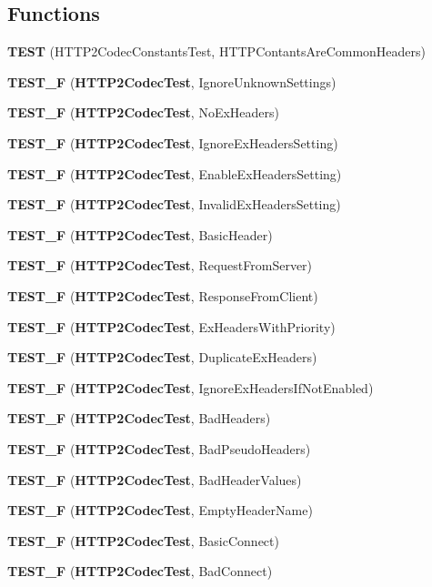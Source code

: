 \subsection*{Functions}
\begin{DoxyCompactItemize}
\item 
{\bf T\+E\+ST} (H\+T\+T\+P2\+Codec\+Constants\+Test, H\+T\+T\+P\+Contants\+Are\+Common\+Headers)
\item 
{\bf T\+E\+S\+T\+\_\+F} ({\bf H\+T\+T\+P2\+Codec\+Test}, Ignore\+Unknown\+Settings)
\item 
{\bf T\+E\+S\+T\+\_\+F} ({\bf H\+T\+T\+P2\+Codec\+Test}, No\+Ex\+Headers)
\item 
{\bf T\+E\+S\+T\+\_\+F} ({\bf H\+T\+T\+P2\+Codec\+Test}, Ignore\+Ex\+Headers\+Setting)
\item 
{\bf T\+E\+S\+T\+\_\+F} ({\bf H\+T\+T\+P2\+Codec\+Test}, Enable\+Ex\+Headers\+Setting)
\item 
{\bf T\+E\+S\+T\+\_\+F} ({\bf H\+T\+T\+P2\+Codec\+Test}, Invalid\+Ex\+Headers\+Setting)
\item 
{\bf T\+E\+S\+T\+\_\+F} ({\bf H\+T\+T\+P2\+Codec\+Test}, Basic\+Header)
\item 
{\bf T\+E\+S\+T\+\_\+F} ({\bf H\+T\+T\+P2\+Codec\+Test}, Request\+From\+Server)
\item 
{\bf T\+E\+S\+T\+\_\+F} ({\bf H\+T\+T\+P2\+Codec\+Test}, Response\+From\+Client)
\item 
{\bf T\+E\+S\+T\+\_\+F} ({\bf H\+T\+T\+P2\+Codec\+Test}, Ex\+Headers\+With\+Priority)
\item 
{\bf T\+E\+S\+T\+\_\+F} ({\bf H\+T\+T\+P2\+Codec\+Test}, Duplicate\+Ex\+Headers)
\item 
{\bf T\+E\+S\+T\+\_\+F} ({\bf H\+T\+T\+P2\+Codec\+Test}, Ignore\+Ex\+Headers\+If\+Not\+Enabled)
\item 
{\bf T\+E\+S\+T\+\_\+F} ({\bf H\+T\+T\+P2\+Codec\+Test}, Bad\+Headers)
\item 
{\bf T\+E\+S\+T\+\_\+F} ({\bf H\+T\+T\+P2\+Codec\+Test}, Bad\+Pseudo\+Headers)
\item 
{\bf T\+E\+S\+T\+\_\+F} ({\bf H\+T\+T\+P2\+Codec\+Test}, Bad\+Header\+Values)
\item 
{\bf T\+E\+S\+T\+\_\+F} ({\bf H\+T\+T\+P2\+Codec\+Test}, Empty\+Header\+Name)
\item 
{\bf T\+E\+S\+T\+\_\+F} ({\bf H\+T\+T\+P2\+Codec\+Test}, Basic\+Connect)
\item 
{\bf T\+E\+S\+T\+\_\+F} ({\bf H\+T\+T\+P2\+Codec\+Test}, Bad\+Connect)
\item 

\end{DoxyCompactItemize}
